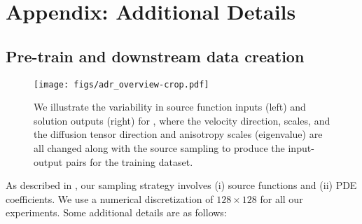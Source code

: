 \appendix
\section{Appendix: Additional Details}
\label{sec:other_details}
\subsection{Pre-train and downstream data creation}
\label{sec:data_creation}
\begin{figure*}[!thbp]
  \centering
  \texttt{[image: figs/adr\_overview-crop.pdf]}  
\caption{We illustrate the variability in source function inputs (left) and solution outputs (right) for \sysB{}, where the velocity direction, scales, and the diffusion tensor direction and anisotropy scales (eigenvalue) are all changed along with the source sampling to produce the input-output pairs for the training dataset.}
\label{fig:vis_ad}
\end{figure*}
As described in , our sampling strategy involves (i) source functions and (ii) PDE coefficients. We use a numerical discretization of $128 \times 128$ for all our experiments. Some additional details are as follows:
